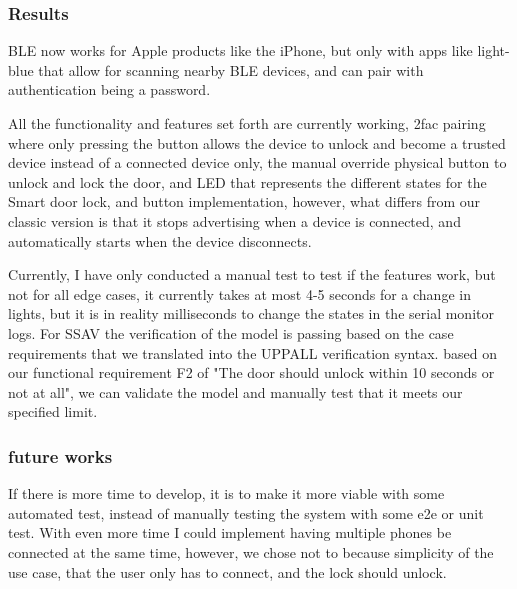 \subsubsection{\textbf{Results}} 
BLE now works for Apple products like the iPhone, but only with apps like light-blue that allow for scanning nearby BLE devices, and can pair with authentication being a password.

All the functionality and features set forth are currently working, 2fac pairing where only pressing the button allows the device to unlock and become a trusted device instead of a connected device only, the manual override physical button to unlock and lock the door, and LED that represents the different states for the Smart door lock, and button implementation, however, what differs from our classic version is that it stops advertising when a device is connected, and automatically starts when the device disconnects.

Currently, I have only conducted a manual test to test if the features work, but not for all edge cases, it currently takes at most 4-5 seconds for a change in lights, but it is in reality milliseconds to change the states in the serial monitor logs. For SSAV the verification of the model is passing based on the case requirements that we translated into the UPPALL verification syntax. based on our functional requirement F2 of "The door should unlock within 10 seconds or not at all", we can validate the model and manually test that it meets our specified limit. 

\subsubsection{\textbf{future works}} 
If there is more time to develop, it is to make it more viable with some automated test, instead of manually testing the system with some e2e or unit test. With even more time I could implement having multiple phones be connected at the same time, however, we chose not to because simplicity of the use case, that the user only has to connect, and the lock should unlock.
